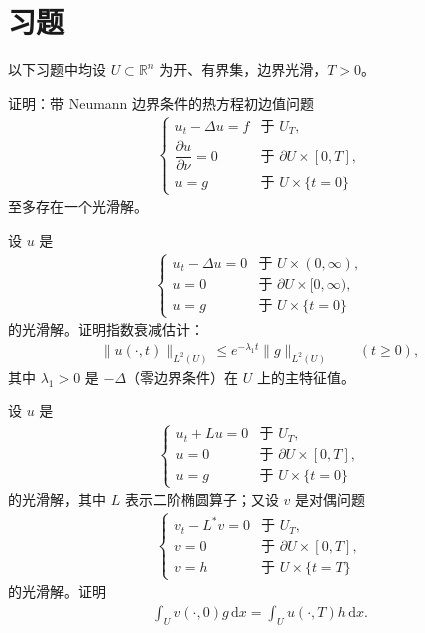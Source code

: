 \documentclass[../../main.tex]{subfiles}
\begin{document}
\section{习题}\label{section:ch07-5-习题}

以下习题中均设 $U\subset\mathbb{R}^n$ 为开、有界集，边界光滑，$T>0$。

\begin{exercise}\label{exercise:ch07-5-1}
证明：带 Neumann 边界条件的热方程初边值问题
\begin{align*}
\begin{cases}
u_t-\Delta u=f & \text{于 } U_T,\\
\dfrac{\partial u}{\partial\nu}=0 & \text{于 } \partial U\times[0,T],\\
u=g & \text{于 } U\times\{t=0\}
\end{cases}
\end{align*}
至多存在一个光滑解。
\end{exercise}

\begin{exercise}\label{exercise:ch07-5-2}
设 $u$ 是
\begin{align*}
\begin{cases}
u_t-\Delta u=0 & \text{于 } U\times(0,\infty),\\
u=0 & \text{于 } \partial U\times[0,\infty),\\
u=g & \text{于 } U\times\{t=0\}
\end{cases}
\end{align*}
的光滑解。证明指数衰减估计：
\begin{align*}
\|u(\cdot,t)\|_{L^2(U)}\leqslant e^{-\lambda_1 t}\|g\|_{L^2(U)}\qquad (t\geqslant 0),
\end{align*}
其中 $\lambda_1>0$ 是 $-\Delta$（零边界条件）在 $U$ 上的主特征值。
\end{exercise}

\begin{exercise}[对偶动力学。]\label{exercise:ch07-5-3}设 $u$ 是
\begin{align*}
\begin{cases}
u_t+Lu=0 & \text{于 } U_T,\\
u=0 & \text{于 } \partial U\times[0,T],\\
u=g & \text{于 } U\times\{t=0\}
\end{cases}
\end{align*}
的光滑解，其中 $L$ 表示二阶椭圆算子；又设 $v$ 是对偶问题
\begin{align*}
\begin{cases}
v_t-L^*v=0 & \text{于 } U_T,\\
v=0 & \text{于 } \partial U\times[0,T],\\
v=h & \text{于 } U\times\{t=T\}
\end{cases}
\end{align*}
的光滑解。证明
\begin{align*}
\int_U v(\cdot,0)g\,\mathrm{d}x=\int_U u(\cdot,T)h\,\mathrm{d}x.
\end{align*}
\end{exercise}
\end{document}
